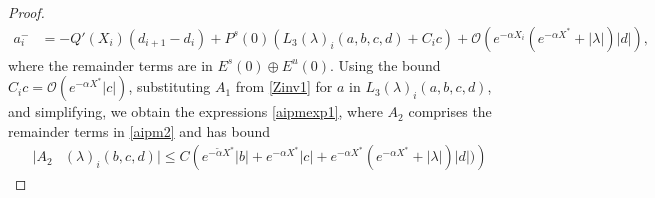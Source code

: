 \documentclass[thesis.tex]{subfiles}
\begin{document}
\begin{lemma}
\begin{proof}
\begin{equation}
\begin{aligned}
a_i^- &= -Q'(X_i) (d_{i+1} - d_i ) + P^s(0) \left( L_3(\lambda)_i(a, b, c, d) + C_i c  \right) + \mathcal{O}( e^{-\alpha X_i} (e^{-\alpha X^*} + |\lambda| )|d|),
\end{aligned}
\end{equation}
where the remainder terms are in $E^s(0) \oplus E^u(0)$. Using the bound $C_i c = \mathcal{O}(e^{-\alpha X^*}|c|)$, substituting $A_1$ from \cref{Zinv1} for $a$ in $L_3(\lambda)_i(a, b, c, d)$, and simplifying, we obtain the expressions \cref{aipmexp1}, where $A_2$ comprises the remainder terms in \cref{aipm2} and has bound
\begin{align*}
|A_2&(\lambda)_i(b, c, d)| \leq C \left(e^{-\tilde{\alpha} X^*}|b| + e^{-\alpha X^*}|c| + e^{-\alpha X^*}(e^{-\alpha X^*} + |\lambda|)|d| ) \right)
\end{align*} 
\end{proof}
\end{lemma}

\end{document}
